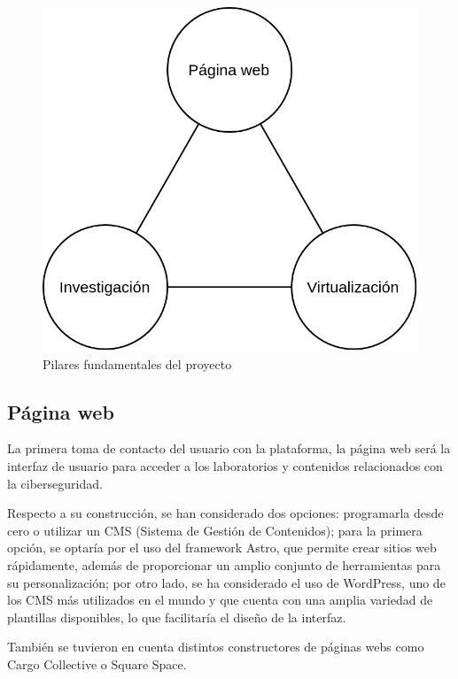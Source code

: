         \begin{figure}[h]
            \centering
            \includegraphics[scale=0.30]{images/Diagramas/Estructura global.png}
            \caption{Pilares fundamentales del proyecto}
            \label{fig:estructura-global}
        \end{figure}
            
        \subsection{Página web}
        
            La primera toma de contacto del usuario con la plataforma, la página web será la interfaz de usuario para acceder a los laboratorios y contenidos relacionados con la ciberseguridad.
            
            Respecto a su construcción, se han considerado dos opciones: programarla desde cero o utilizar un CMS (Sistema de Gestión de Contenidos); para la primera opción, se optaría por el uso del framework Astro, que permite crear sitios web rápidamente, además de proporcionar un amplio conjunto de herramientas para su personalización; por otro lado, se ha considerado el uso de WordPress, uno de los CMS más utilizados en el mundo y que cuenta con una amplia variedad de plantillas disponibles, lo que facilitaría el diseño de la interfaz.

            También se tuvieron en cuenta distintos constructores de páginas webs como Cargo Collective o Square Space.

